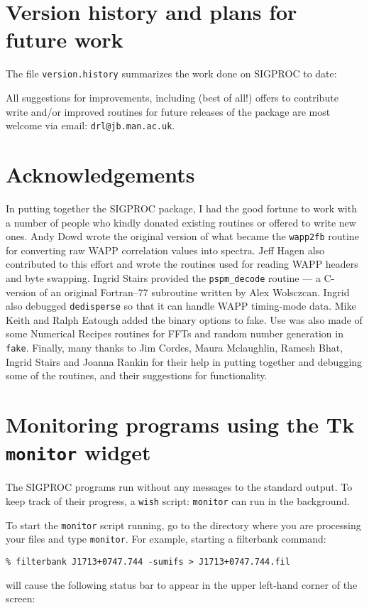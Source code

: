 \documentclass[11pt]{article}
\begin{document}
\section{Version history and plans for future work}
\label{past/future}
The file {\tt version.history} summarizes the work done
on SIGPROC to date:


\noindent
All suggestions for improvements, including (best of all!)
offers to contribute write and/or improved routines for future 
releases of the package are most welcome via email:
{\tt drl@jb.man.ac.uk}.

\section*{Acknowledgements}

In putting together the SIGPROC package, I had the good fortune to
work with a number of people who kindly donated existing routines or
offered to write new ones.  Andy Dowd wrote the original version of
what became the {\tt wapp2fb} routine for converting raw WAPP
correlation values into spectra. Jeff Hagen also contributed to this
effort and wrote the routines used for reading WAPP headers and byte
swapping. Ingrid Stairs provided the \verb+pspm_decode+ routine --- a
C-version of an original Fortran--77 subroutine written by Alex
Wolsczcan. Ingrid also debugged {\tt dedisperse} so that it can handle
WAPP timing-mode data.  Mike Keith and Ralph Eatough added the binary
options to fake. Use was also made of some Numerical Recipes
routines for FFTs and random number generation in {\tt fake}. Finally,
many thanks to Jim Cordes, Maura Mclaughlin, Ramesh Bhat, Ingrid
Stairs and Joanna Rankin
for their help in putting together and debugging some of the
routines, and their suggestions for functionality.

\clearpage
\appendix
\section{Monitoring programs using the Tk {\tt monitor} widget}
\label{monitoring}
The SIGPROC programs run without any messages to the standard
output. To keep track of their progress, a {\tt wish} script:
{\tt monitor} can run in the background. 

To start the {\tt monitor} script running, go to the directory
where you are processing your files and type {\tt monitor}.
For example, starting a filterbank command:
\begin{verbatim}
% filterbank J1713+0747.744 -sumifs > J1713+0747.744.fil
\end{verbatim}
will cause the following status bar to appear in the upper left-hand
corner of the screen:
\end{document}
